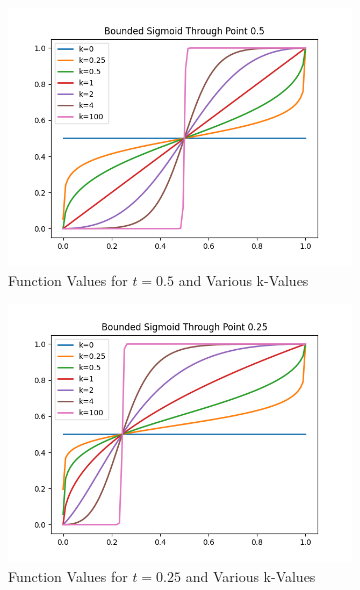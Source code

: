 \begin{figure}[htbp]
    \centering
    \begin{subfigure}[b]{0.3\textwidth}
        \includegraphics[width=\textwidth]{figures/soft_sigmoidt05.png}
        \caption{Function Values for $t=0.5$ and Various k-Values}
        \label{fig:sub1}
    \end{subfigure}
    \hfill
    \begin{subfigure}[b]{0.3\textwidth}
        \includegraphics[width=\textwidth]{figures/soft_sigmoidt25.png}
        \caption{Function Values for $t=0.25$ and Various k-Values}
        \label{fig:sub2}
    \end{subfigure}
    \hfill
    \begin{subfigure}[b]{0.3\textwidth}

\end{subfigure}
\end{figure}
